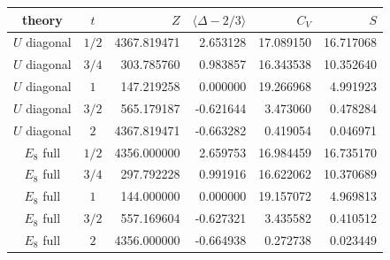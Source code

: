 \begin{tabular}{c|c|rrrr}
theory & $t$ & $Z$ & $\langle\Delta-2/3\rangle$ & $C_V$ & $S$\\\hline
$U$ diagonal & $1/2$ & 4367.819471 & 2.653128 & 17.089150 & 16.717068\\
$U$ diagonal & $3/4$ & 303.785760 & 0.983857 & 16.343538 & 10.352640\\
$U$ diagonal & $1$ & 147.219258 & 0.000000 & 19.266968 & 4.991923\\
$U$ diagonal & $3/2$ & 565.179187 & -0.621644 & 3.473060 & 0.478284\\
$U$ diagonal & $2$ & 4367.819471 & -0.663282 & 0.419054 & 0.046971\\
$E_8$ full & $1/2$ & 4356.000000 & 2.659753 & 16.984459 & 16.735170\\
$E_8$ full & $3/4$ & 297.792228 & 0.991916 & 16.622062 & 10.370689\\
$E_8$ full & $1$ & 144.000000 & 0.000000 & 19.157072 & 4.969813\\
$E_8$ full & $3/2$ & 557.169604 & -0.627321 & 3.435582 & 0.410512\\
$E_8$ full & $2$ & 4356.000000 & -0.664938 & 0.272738 & 0.023449\\
\end{tabular}
